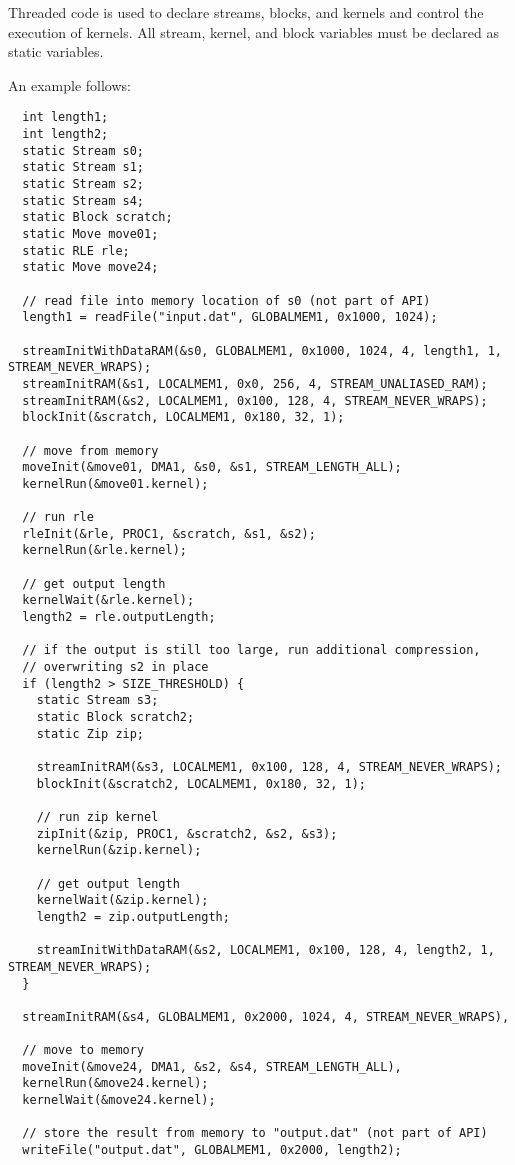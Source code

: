 Threaded code is used to declare streams, blocks, and kernels and control the execution of kernels. All stream, kernel, and block variables must be declared as static variables.

An example follows:
{\small
\begin{verbatim}
  int length1;
  int length2;
  static Stream s0;
  static Stream s1;
  static Stream s2;
  static Stream s4;
  static Block scratch;
  static Move move01;
  static RLE rle;
  static Move move24;

  // read file into memory location of s0 (not part of API)
  length1 = readFile("input.dat", GLOBALMEM1, 0x1000, 1024);

  streamInitWithDataRAM(&s0, GLOBALMEM1, 0x1000, 1024, 4, length1, 1, STREAM_NEVER_WRAPS);
  streamInitRAM(&s1, LOCALMEM1, 0x0, 256, 4, STREAM_UNALIASED_RAM);
  streamInitRAM(&s2, LOCALMEM1, 0x100, 128, 4, STREAM_NEVER_WRAPS);
  blockInit(&scratch, LOCALMEM1, 0x180, 32, 1);

  // move from memory
  moveInit(&move01, DMA1, &s0, &s1, STREAM_LENGTH_ALL);
  kernelRun(&move01.kernel);
  
  // run rle
  rleInit(&rle, PROC1, &scratch, &s1, &s2);
  kernelRun(&rle.kernel);

  // get output length
  kernelWait(&rle.kernel);
  length2 = rle.outputLength;
  
  // if the output is still too large, run additional compression, 
  // overwriting s2 in place
  if (length2 > SIZE_THRESHOLD) {
    static Stream s3;
    static Block scratch2;
    static Zip zip;

    streamInitRAM(&s3, LOCALMEM1, 0x100, 128, 4, STREAM_NEVER_WRAPS);
    blockInit(&scratch2, LOCALMEM1, 0x180, 32, 1);

    // run zip kernel
    zipInit(&zip, PROC1, &scratch2, &s2, &s3);
    kernelRun(&zip.kernel);
    
    // get output length
    kernelWait(&zip.kernel);
    length2 = zip.outputLength;

    streamInitWithDataRAM(&s2, LOCALMEM1, 0x100, 128, 4, length2, 1, STREAM_NEVER_WRAPS);
  }
  
  streamInitRAM(&s4, GLOBALMEM1, 0x2000, 1024, 4, STREAM_NEVER_WRAPS),
  
  // move to memory
  moveInit(&move24, DMA1, &s2, &s4, STREAM_LENGTH_ALL),
  kernelRun(&move24.kernel);
  kernelWait(&move24.kernel);

  // store the result from memory to "output.dat" (not part of API)
  writeFile("output.dat", GLOBALMEM1, 0x2000, length2); \end{verbatim}}

